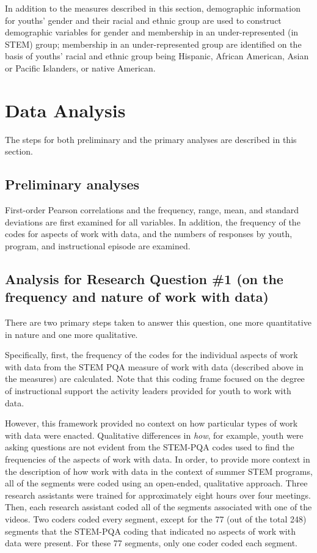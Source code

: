 \documentclass[]{book}
\theoremstyle{definition}
\theoremstyle{definition}
\theoremstyle{definition}
\theoremstyle{remark}
\begin{document}
In addition to the measures described in this section, demographic
information for youths' gender and their racial and ethnic group are
used to construct demographic variables for gender and membership in an
under-represented (in STEM) group; membership in an under-represented
group are identified on the basis of youths' racial and ethnic group
being Hispanic, African American, Asian or Pacific Islanders, or native
American.

\section{Data Analysis}\label{data-analysis}

The steps for both preliminary and the primary analyses are described in
this section.

\subsection{Preliminary analyses}\label{preliminary-analyses}

First-order Pearson correlations and the frequency, range, mean, and
standard deviations are first examined for all variables. In addition,
the frequency of the codes for aspects of work with data, and the
numbers of responses by youth, program, and instructional episode are
examined.

\subsection{Analysis for Research Question \#1 (on the frequency and
nature of work with
data)}\label{analysis-for-research-question-1-on-the-frequency-and-nature-of-work-with-data}

There are two primary steps taken to answer this question, one more
quantitative in nature and one more qualitative.

Specifically, first, the frequency of the codes for the individual
aspects of work with data from the STEM PQA measure of work with data
(described above in the measures) are calculated. Note that this coding
frame focused on the degree of instructional support the activity
leaders provided for youth to work with data.

However, this framework provided no context on how particular types of
work with data were enacted. Qualitative differences in \emph{how}, for
example, youth were asking questions are not evident from the STEM-PQA
codes used to find the frequencies of the aspects of work with data. In
order, to provide more context in the description of how work with data
in the context of summer STEM programs, all of the segments were coded
using an open-ended, qualitative approach. Three research assistants
were trained for approximately eight hours over four meetings. Then,
each research assistant coded all of the segments associated with one of
the videos. Two coders coded every segment, except for the 77 (out of
the total 248) segments that the STEM-PQA coding that indicated no
aspects of work with data were present. For these 77 segments, only one
coder coded each segment.
\end{document}
